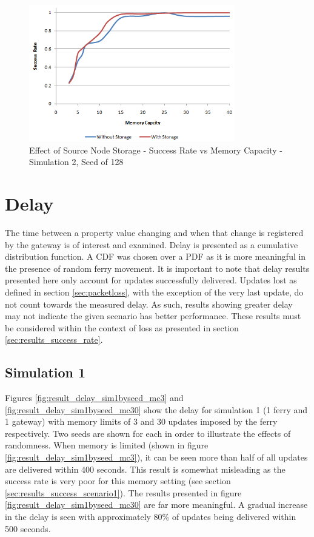 \begin{figure}[htbp]
    \centering
    \includegraphics[width=0.8\textwidth]{images/result_sccess_sim2byss_128.png}
    \caption{Effect of Source Node Storage - Success Rate vs Memory Capacity - Simulation 2, Seed of 128}
    \label{fig:result_sccess_sim2byss_128}
\end{figure}


\section{Delay}
\label{sec:results_delay}
The time between a property value changing and when that change is registered by the gateway is of interest and examined.
Delay is presented as a cumulative distribution function.
A CDF was chosen over a PDF as it is more meaningful in the presence of random ferry movement.
It is important to note that delay results presented here only account for updates successfully delivered.
Updates lost as defined in section \ref{sec:packetloss}, with the exception of the very last update, do not count towards the measured delay.
As such, results showing greater delay may not indicate the given scenario has better performance.
These results must be considered within the context of loss as presented in section \ref{sec:results_success_rate}.

\subsection{Simulation 1}

Figures \ref{fig:result_delay_sim1byseed_mc3} and \ref{fig:result_delay_sim1byseed_mc30} show the delay for simulation 1 (1 ferry and 1 gateway) with memory limits of 3 and 30 updates imposed by the ferry respectively.
Two seeds are shown for each in order to illustrate the effects of randomness.
When memory is limited (shown in figure \ref{fig:result_delay_sim1byseed_mc3}), it can be seen more than half of all updates are delivered within 400 seconds. 
This result is somewhat misleading as the success rate is very poor for this memory setting (see section \ref{sec:results_success_scenario1}).
The results presented in figure \ref{fig:result_delay_sim1byseed_mc30} are far more meaningful.
A gradual increase in the delay is seen with approximately 80\% of updates being delivered within 500 seconds.


